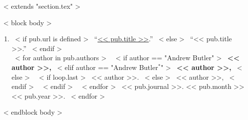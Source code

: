 ~< extends "section.tex" >~

~< block body >~
\begin{small}
  \begin{enumerate}
    \itemsep 1em
    ~< for pub in items >~
      \item{
        ~< if pub.url is defined >~
          ``\href{<< pub.url >>}{<< pub.title >>}.''
        ~< else >~
          ``<< pub.title >>.''
        ~< endif >~\\
      	~< for author in pub.authors >~
      		~< if author == "Andrew Butler" >~
      			\textbf{ << author >>, }	
      		~< elif author == "Andrew Butler$^*$" >~
      			\textbf{ << author >>, }
      		~< else >~
            ~< if loop.last >~
              << author >>. 
            ~< else >~
              << author >>, 
            ~< endif >~
          ~< endif >~
      	~< endfor >~
        << pub.journal >>.
        << pub.month >>
        << pub.year >>.
      }
    ~< endfor >~
  \end{enumerate}
\end{small}
~< endblock body >~
